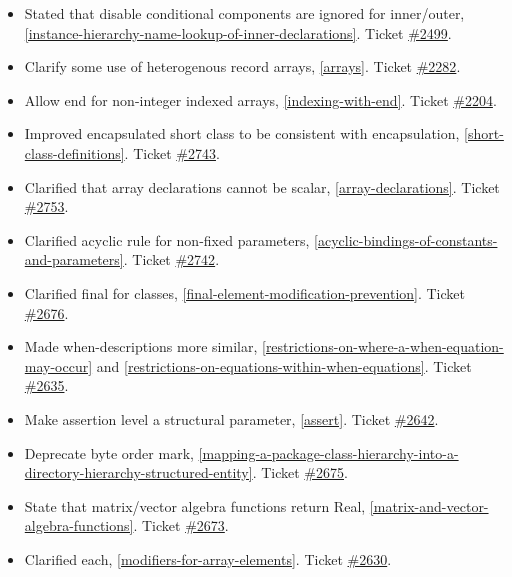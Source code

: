 \begin{itemize}
\item Stated that disable conditional components are ignored for inner/outer, \cref{instance-hierarchy-name-lookup-of-inner-declarations}.
Ticket \href{https://github.com/modelica/ModelicaSpecification/issues/2499}{\#2499}.
\item Clarify some use of heterogenous record arrays, \cref{arrays}.
Ticket \href{https://github.com/modelica/ModelicaSpecification/issues/2282}{\#2282}.
\item Allow end for non-integer indexed arrays, \cref{indexing-with-end}.
Ticket \href{https://github.com/modelica/ModelicaSpecification/issues/2204}{\#2204}.
\item Improved encapsulated short class to be consistent with encapsulation, \cref{short-class-definitions}.
Ticket \href{https://github.com/modelica/ModelicaSpecification/issues/2743}{\#2743}.
\item Clarified that array declarations cannot be scalar, \cref{array-declarations}.
Ticket \href{https://github.com/modelica/ModelicaSpecification/pull/2753}{\#2753}.
\item Clarified acyclic rule for non-fixed parameters, \cref{acyclic-bindings-of-constants-and-parameters}.
Ticket \href{https://github.com/modelica/ModelicaSpecification/pull/2742}{\#2742}.
\item Clarified final for classes, \cref{final-element-modification-prevention}.
Ticket \href{https://github.com/modelica/ModelicaSpecification/issues/2676}{\#2676}.
\item Made when-descriptions more similar, \cref{restrictions-on-where-a-when-equation-may-occur} and \cref{restrictions-on-equations-within-when-equations}.
Ticket \href{https://github.com/modelica/ModelicaSpecification/issues/2635}{\#2635}.
\item Make assertion level a structural parameter, \cref{assert}.
Ticket \href{https://github.com/modelica/ModelicaSpecification/issues/2642}{\#2642}.
\item Deprecate byte order mark, \cref{mapping-a-package-class-hierarchy-into-a-directory-hierarchy-structured-entity}.
Ticket \href{https://github.com/modelica/ModelicaSpecification/issues/2675}{\#2675}.
\item State that matrix/vector algebra functions return Real, \cref{matrix-and-vector-algebra-functions}.
Ticket \href{https://github.com/modelica/ModelicaSpecification/pull/2673}{\#2673}.
\item Clarified each, \cref{modifiers-for-array-elements}.
Ticket \href{https://github.com/modelica/ModelicaSpecification/issues/2630}{\#2630}.

\end{itemize}
